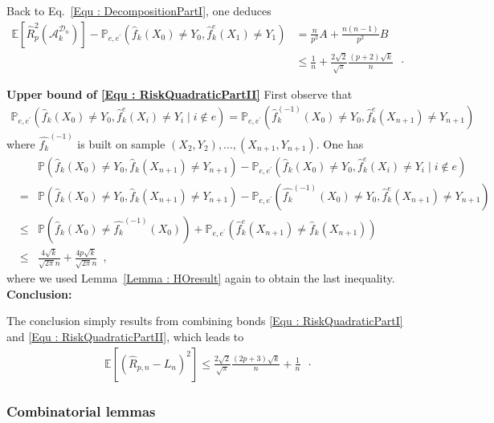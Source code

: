 \documentclass[twoside,11pt]{article}
\numberwithin{equation}{section}
\newcommand{\esp}[1]{\mathbb{E}\left[#1 \right]}
\newcommand{\f}[1]{ \widehat{f}_k( #1 ) }
\newcommand{\fe}[1]{ \widehat{f}_k^e(#1 ) }
\newcommand{\1}{\mathds{1}}%
\newcommand{\paren}[1]{\left( #1 \right)}
\renewcommand{\P}{\mathbb{P}}
\newcommand{\Rh}{\widehat{R}}
\newcommand{\Dn}{\mathcal{D}_n}
\newcommand{\A}{\mathcal{A}}
\numberwithin{equation}{section}
\theoremstyle{plain}
\begin{document}
%
Back to Eq.~\eqref{Equ : DecompositionPartI}, one deduces
\begin{align*}
\esp{\Rh_p^2(\A_k^{\Dn})} - \P_{e,e^\prime} \paren{\f{X_0}\neq Y_0,\fe{X_{1}}\neq Y_{1}}
&= \frac{n}{p^2}A + \frac{n(n-1)}{p^2}B \\
%
& \leq \frac{1}{n} + \frac{2\sqrt{2}}{\sqrt{\pi}}\frac{(p+2)\sqrt{k}}{n}\enspace\cdot
\end{align*}






\noindent\textbf{Upper bound of \eqref{Equ : RiskQuadraticPartII}}
%
First observe that
\begin{eqnarray*}
\P_{e,e^\prime} \paren{\f{X_0}\neq Y_0,\fe{X_{i}}\neq Y_{i}\mid i\notin e} = \P_{e,e^\prime} \paren{\widehat{f}_k^{(-1)}(X_0)\neq Y_0,\fe{X_{n+1}}\neq Y_{n+1}}
\end{eqnarray*}
where $\widehat{f_k}^{(-1)}$ is built on sample $(X_2,Y_2),...,(X_{n+1},Y_{n+1})$. One has
%
\begin{eqnarray*}
&& \P\paren{\f{X_0}\neq Y_0,\f{X_{n+1}}\neq Y_{n+1}} - \P_{e,e^\prime} \paren{\f{X_0}\neq Y_0,\fe{X_{i}}\neq Y_{i} \mid i\notin e} \\
%
 &=& \P\paren{\f{X_0}\neq Y_0,\f{X_{n+1}}\neq Y_{n+1}} - \P_{e,e^\prime} \paren{\widehat{f_k}^{(-1)}(X_0)\neq Y_0,\fe{X_{n+1}}\neq Y_{n+1}}\\
%
&\leq& \P\paren{\f{X_0}\neq \widehat{f_k}^{(-1)}(X_0)} + \P_{e,e^\prime} \paren{\fe{X_{n+1}}\neq \f{X_{n+1}}}\\
&\leq& \frac{4\sqrt{k}}{\sqrt{2\pi} n} + \frac{4p\sqrt{k}}{\sqrt{2\pi} n}\enspace,
\end{eqnarray*}
where we used Lemma~\ref{Lemma : HOresult} again to obtain the last inequality.\\

\noindent\textbf{Conclusion:}

The conclusion simply results from combining bonds \eqref{Equ : RiskQuadraticPartI} and \eqref{Equ : RiskQuadraticPartII}, which leads to
\begin{eqnarray*}
\esp{\left(\Rh_{p,n}-L_n\right)^2} \leq \frac{2\sqrt{2}}{\sqrt{\pi}}\frac{(2p+3)\sqrt{k}}{n} + \frac{1}{n} \enspace\cdot
\end{eqnarray*}



\subsubsection{Combinatorial lemmas}
\end{document}
